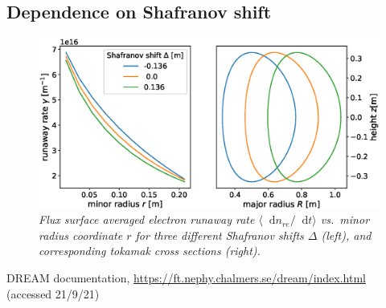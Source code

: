 \documentclass[11pt,a4paper]{article}
\newcommand*\diff{\mathop{}\!\mathrm{d}}
\begin{document}
\subsection{Dependence on Shafranov shift}
\begin{figure}[H]
    \centering
    \includegraphics[width=\textwidth]{figs/shafranovShift.eps}
    \caption{\textit{Flux surface averaged electron runaway rate $\langle\diff{n}_{re}/\diff{t}\rangle$ vs.\ minor radius coordinate $r$ for three different Shafranov shifts $\Delta$ (left), and corresponding tokamak cross sections (right).}}
    \label{fig:shafranovShift}
\end{figure}

\begin{thebibliography}{100}
    DREAM documentation, \url{https://ft.nephy.chalmers.se/dream/index.html} (accessed 21/9/21)

\end{thebibliography}
\end{document}
